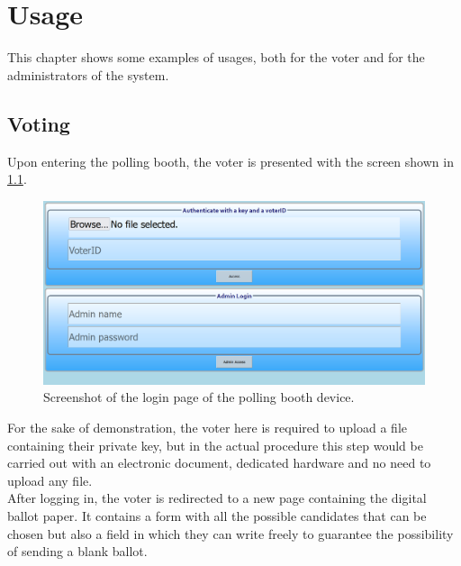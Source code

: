 %
\chapter{Usage}\label{ch:usage}
This chapter shows some examples of usages, both for the voter and for the administrators of the system.\\

\section*{Voting}
Upon entering the polling booth, the voter is presented with the screen shown in \ref{fig:login}.\\

\begin{figure}[H]
    \begin{center}
        \includegraphics[scale=0.4]{img/login.png}
    \end{center}
    \vspace*{-0.5cm}
    \caption{Screenshot of the login page of the polling booth device.}
    \label{fig:login}
\end{figure}

For the sake of demonstration, the voter here is required to upload a file containing their private key, but in the actual procedure this step would be carried out with an electronic document, dedicated hardware and no need to upload any file.\\
After logging in, the voter is redirected to a new page containing the digital ballot paper. It contains a form with all the possible candidates that can be chosen but also a field in which they can write freely to guarantee the possibility of sending a blank ballot.\\

